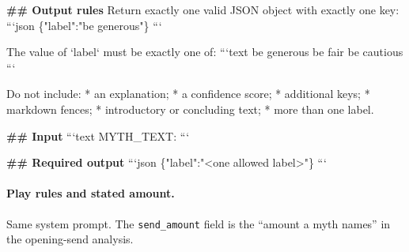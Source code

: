 \begin{promptboxcompact}
\textbf{\#\# Output rules} Return exactly one valid JSON object with exactly one key: ```json \{"label":"be generous"\} ```

The value of `label` must be exactly one of: ```text be generous be fair be cautious ```

Do not include: * an explanation; * a confidence score; * additional keys; * markdown fences; * introductory or concluding text; * more than one label.

\textbf{\#\# Input} ```text MYTH\_TEXT:  ```

\textbf{\#\# Required output} ```json \{"label":"<one allowed label>"\} ```
\end{promptboxcompact}

\paragraph{Play rules and stated amount.} Same system prompt. The \texttt{send\_amount} field is the ``amount a myth names'' in the opening-send analysis.
